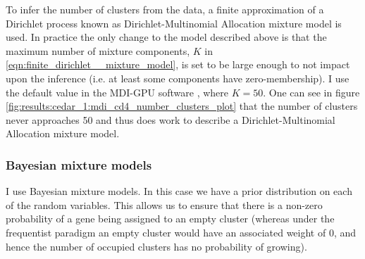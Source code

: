 \documentclass[14pt]{extarticle} %
\begin{document}
	To infer the number of clusters from the data, a finite approximation of a Dirichlet process known as Dirichlet-Multinomial Allocation mixture model \citep{green2001modelling} is used. In practice the only change to the model described above is that the maximum  number  of mixture components, $K$ in \eqref{eqn:finite_dirichlet__mixture_model}, is set to be large enough to not impact upon the inference (i.e. at least some components have zero-membership). I use the default value in the MDI-GPU software \citep{MasonMDIGPUacceleratingintegrative2016a}, where $K=50$. One can see in figure \ref{fig:results:cedar_1:mdi_cd4_number_clusters_plot} that the number of clusters never approaches 50 and thus does work to describe a Dirichlet-Multinomial Allocation mixture model.
	

	
	\subsubsection{Bayesian mixture models}
	I use Bayesian mixture models. In this case we have a prior distribution on each of the random variables. This allows us to ensure that there is a non-zero probability of a gene being assigned to an empty cluster (whereas under the frequentist paradigm an empty cluster would have an associated weight of 0, and hence the number of occupied clusters has no probability of growing). 
	
\end{document}
